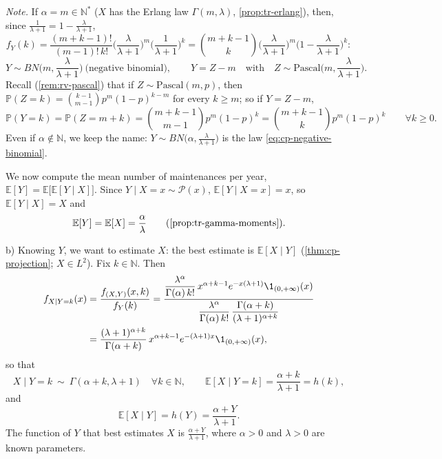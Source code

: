 \begin{example}
\emph{Note.} If $\alpha=m\in\mathbb N^*$ ($X$ has the Erlang law $\Gamma(m,\lambda)$,
\cref{prop:tr-erlang}), then, since $\frac1{\lambda+1}=1-\frac\lambda{\lambda+1}$,
\[
  f_Y(k)=\frac{(m+k-1)!}{(m-1)!\,k!}\Big(\frac\lambda{\lambda+1}\Big)^m\Big(\frac1{\lambda+1}\Big)^k
  =\binom{m+k-1}k\Big(\frac\lambda{\lambda+1}\Big)^m\Big(1-\frac\lambda{\lambda+1}\Big)^k :
\]
\[
  Y\sim BN\Big(m,\frac\lambda{\lambda+1}\Big)\ \text{(negative binomial)},\qquad Y=Z-m\quad\text{with}\quad
  Z\sim\mathrm{Pascal}\Big(m,\frac\lambda{\lambda+1}\Big).
\]
Recall (\cref{rem:rv-pascal}) that if $Z\sim\mathrm{Pascal}(m,p)$, then
$\mathbb P(Z=k)=\binom{k-1}{m-1}p^m(1-p)^{k-m}$ for every $k\ge m$; so if $Y=Z-m$,
\[
  \mathbb P(Y=k)=\mathbb P(Z=m+k)=\binom{m+k-1}{m-1}p^m(1-p)^k=\binom{m+k-1}kp^m(1-p)^k\qquad\forall k\ge0 .
\]
Even if $\alpha\notin\mathbb N$, we keep the name: $Y\sim BN\big(\alpha,\frac\lambda{\lambda+1}\big)$
is the law \eqref{eq:cp-negative-binomial}.

We now compute the mean number of maintenances per year, $\mathbb E[Y]=\mathbb E\big[\mathbb E[Y\mid X]\big]$.
Since $Y\mid X=x\sim\mathcal P(x)$, $\mathbb E[Y\mid X=x]=x$, so $\mathbb E[Y\mid X]=X$ and
\[
  \mathbb E[Y]=\mathbb E[X]=\frac\alpha\lambda\qquad\text{(\cref{prop:tr-gamma-moments})}.
\]

b) Knowing $Y$, we want to estimate $X$: the best estimate is $\mathbb E[X\mid Y]$
(\cref{thm:cp-projection}; $X\in L^2$). Fix $k\in\mathbb N$. Then
\[
\begin{aligned}
  f_{X\mid Y=k}(x)&=\frac{f_{(X,Y)}(x,k)}{f_Y(k)}
  =\frac{\dfrac{\lambda^\alpha}{\Gamma(\alpha)\,k!}\,x^{\alpha+k-1}e^{-x(\lambda+1)}\1_{(0,+\infty)}(x)}{\dfrac{\lambda^\alpha}{\Gamma(\alpha)\,k!}\,\dfrac{\Gamma(\alpha+k)}{(\lambda+1)^{\alpha+k}}}\\
  &=\frac{(\lambda+1)^{\alpha+k}}{\Gamma(\alpha+k)}\,x^{\alpha+k-1}e^{-(\lambda+1)x}\1_{(0,+\infty)}(x),
\end{aligned}
\]
so that
\[
  X\mid Y=k\ \sim\ \Gamma(\alpha+k,\lambda+1)\quad\forall k\in\mathbb N,\qquad
  \mathbb E[X\mid Y=k]=\frac{\alpha+k}{\lambda+1}=h(k),
\]
and
\[
  \mathbb E[X\mid Y]=h(Y)=\frac{\alpha+Y}{\lambda+1}.
\]
The function of $Y$ that best estimates $X$ is $\frac{\alpha+Y}{\lambda+1}$, where $\alpha>0$ and
$\lambda>0$ are known parameters.
\end{example}

